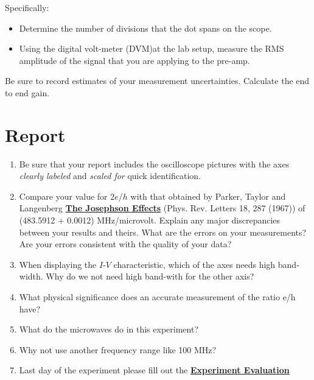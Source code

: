 \documentclass{../lab}
\begin{document}
\vspace{1em}

\noindent Specifically:

\begin{itemize}
    \item Determine the number of divisions that the dot spans on the scope.

    \item Using the digital volt-meter (DVM)at the lab setup, measure the RMS amplitude of the signal that you are applying to the pre-amp.
\end{itemize}

Be sure to record estimates of your measurement uncertainties. Calculate the end to end gain.

\section{Report}

\begin{enumerate}
    \item Be sure that your report includes the oscilloscope pictures with the axes \emph{clearly labeled} and \emph{scaled for} quick identification.

    \item Compare your value for 2$e/h$ with that obtained by Parker, Taylor and Langenberg \href{http://physics111.lib.berkeley.edu/Physics111/Reprints/JOS/04-The\_Josephson\_Effects.pdf}{\textbf{The Josephson Effects}} (Phys. Rev. Letters 18, 287 (1967)) of (483.5912 + 0.0012) MHz/microvolt. Explain any major discrepancies between your results and theirs. What are the errors on your measurements? Are your errors consistent with the quality of your data?

    \item When displaying the $I$-$V$ characteristic, which of the axes needs high band-width. Why do we not need high band-with for the other axis?

    \item What physical significance does an accurate measurement of the ratio e/h have?

    \item What do the microwaves do in this experiment?

    \item Why not use another frequency range like 100 MHz?

    \item Last day of the experiment please fill out the \href{\ExperimentEvaluation}{\textbf{Experiment Evaluation}}

\end{enumerate}
\end{document}
